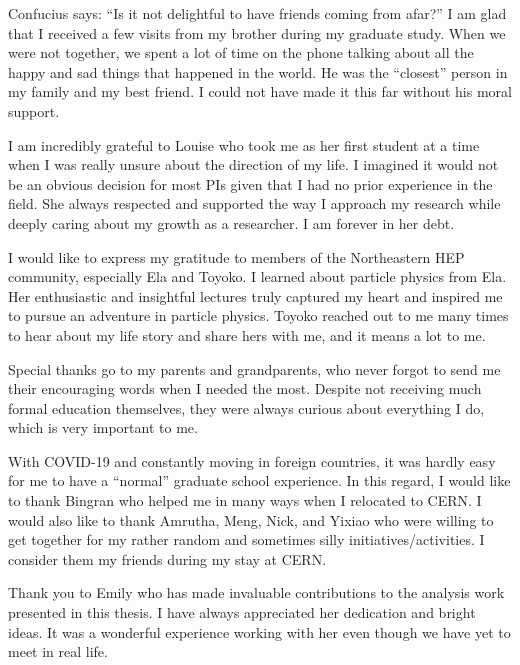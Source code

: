 \begin{acknowledgments}

Confucius says: ``Is it not delightful to have friends coming from afar?'' I am glad that I received a few visits from my brother during my graduate study. When we were not together, we spent a lot of time on the phone talking about all the happy and sad things that happened in the world. He was the ``closest'' person in my family and my best friend. I could not have made it this far without his moral support.

I am incredibly grateful to Louise who took me as her first student at a time when I was really unsure about the direction of my life. I imagined it would not be an obvious decision for most PIs given that I had no prior experience in the field. She always respected and supported the way I approach my research while deeply caring about my growth as a researcher. I am forever in her debt.  

I would like to express my gratitude to members of the Northeastern HEP community, especially Ela and Toyoko. I learned about particle physics from Ela. Her enthusiastic and insightful lectures truly captured my heart and inspired me to pursue an adventure in particle physics. Toyoko reached out to me many times to hear about my life story and share hers with me, and it means a lot to me.

Special thanks go to my parents and grandparents, who never forgot to send me their encouraging words when I needed the most. Despite not receiving much formal education themselves, they were always curious about everything I do, which is very important to me.

With COVID-19 and constantly moving in foreign countries, it was hardly easy for me to have a ``normal'' graduate school experience. In this regard, I would like to thank Bingran who helped me in many ways when I relocated to CERN. I would also like to thank Amrutha, Meng, Nick, and Yixiao who were willing to get together for my rather random and sometimes silly initiatives/activities. I consider them my friends during my stay at CERN.

Thank you to Emily who has made invaluable contributions to the analysis work presented in this thesis. I have always appreciated her dedication and bright ideas. It was a wonderful experience working with her even though we have yet to meet in real life.

\end{acknowledgments}